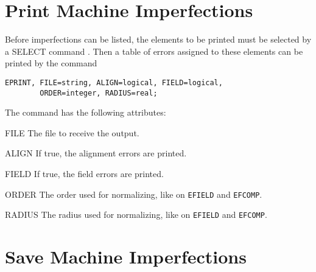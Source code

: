 \section{Print Machine Imperfections}
\label{sec:errorprint}

Before imperfections can be listed,
the elements to be printed must be selected by a
{SELECT} command .
Then a table of errors assigned to these elements can be printed
by the command
\begin{verbatim}
EPRINT, FILE=string, ALIGN=logical, FIELD=logical,
        ORDER=integer, RADIUS=real;
\end{verbatim}
The command has the following attributes:
\begin{kdescription}
\item[FILE]
  The file to receive the output.
\item[ALIGN]
  If true, the alignment errors are printed.
\item[FIELD]
  If true, the field errors are printed.
\item[ORDER]
  The order used for normalizing, like on \texttt{EFIELD} and
  \texttt{EFCOMP}.
\item[RADIUS]
  The radius used for normalizing, like on \texttt{EFIELD} and
  \texttt{EFCOMP}.
\end{kdescription}

\section{Save Machine Imperfections}
\label{sec:errorsave}

